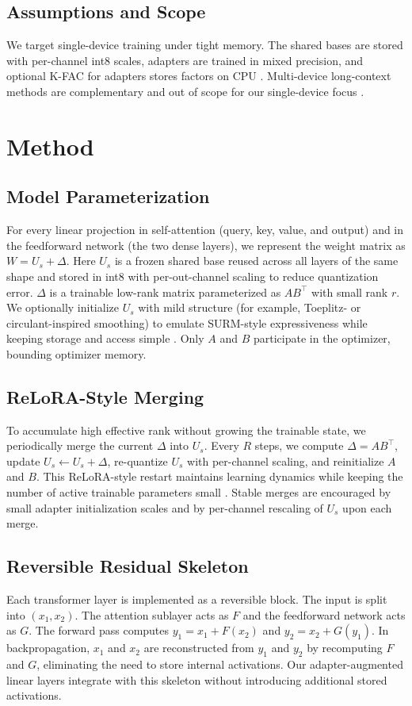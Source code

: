 \documentclass{article}
\begin{document}
\subsection{Assumptions and Scope}
We target single-device training under tight memory. The shared bases are stored with per-channel int8 scales, adapters are trained in mixed precision, and optional K-FAC for adapters stores factors on CPU \cite{eschenhagen-2023-kronecker}. Multi-device long-context methods are complementary and out of scope for our single-device focus \cite{liu-2023-ringattention}.

\section{Method}
\subsection{Model Parameterization}
For every linear projection in self-attention (query, key, value, and output) and in the feedforward network (the two dense layers), we represent the weight matrix as \(W = U_s + \Delta\). Here \(U_s\) is a frozen shared base reused across all layers of the same shape and stored in int8 with per-out-channel scaling to reduce quantization error. \(\Delta\) is a trainable low-rank matrix parameterized as \(A B^{\top}\) with small rank \(r\). We optionally initialize \(U_s\) with mild structure (for example, Toeplitz- or circulant-inspired smoothing) to emulate SURM-style expressiveness while keeping storage and access simple \cite{sehanobish-2024-structured}. Only \(A\) and \(B\) participate in the optimizer, bounding optimizer memory.

\subsection{ReLoRA-Style Merging}
To accumulate high effective rank without growing the trainable state, we periodically merge the current \(\Delta\) into \(U_s\). Every \(R\) steps, we compute \(\Delta = A B^{\top}\), update \(U_s \leftarrow U_s + \Delta\), re-quantize \(U_s\) with per-channel scaling, and reinitialize \(A\) and \(B\). This ReLoRA-style restart maintains learning dynamics while keeping the number of active trainable parameters small \cite{lialin-2023-relora}. Stable merges are encouraged by small adapter initialization scales and by per-channel rescaling of \(U_s\) upon each merge.

\subsection{Reversible Residual Skeleton}
Each transformer layer is implemented as a reversible block. The input is split into \((x_1, x_2)\). The attention sublayer acts as \(F\) and the feedforward network acts as \(G\). The forward pass computes \(y_1 = x_1 + F(x_2)\) and \(y_2 = x_2 + G(y_1)\). In backpropagation, \(x_1\) and \(x_2\) are reconstructed from \(y_1\) and \(y_2\) by recomputing \(F\) and \(G\), eliminating the need to store internal activations. Our adapter-augmented linear layers integrate with this skeleton without introducing additional stored activations.
\end{document}
